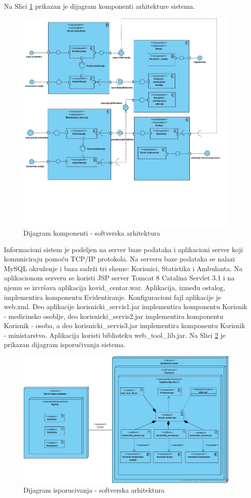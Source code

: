 \documentclass[titlepage]{article}
\begin{document}
Na Slici \ref{slk:komponente} prikazan je dijagram komponenti arhitekture sistema.

\begin{figure}[H]
\centering
\includegraphics[scale=0.65]{Dijagram_komponenti}
\caption{Dijagram komponenti - softverska arhitektura}
\label{slk:komponente}
\end{figure}

Informacioni sistem je podeljen na server baze podataka i aplikacioni server koji komuniciraju pomoću TCP/IP protokola. Na serveru baze podataka se nalazi MySQL okruženje i baza sadrži tri sheme: Korisnici, Statistika i Ambulanta. Na aplikacionom serveru se koristi JSP server Tomcat 8 Catalina Servlet 3.1 i na njemu se izvršava aplikacija kovid\_centar.war. Aplikacija, između ostalog, implementira komponentu Evidentiranje. Konfiguracioni fajl aplikacije je web.xml. Deo aplikacije korisnicki\_servis1.jar implementira komponentu Korisnik - medicinsko osoblje, deo korisnicki\_servis2.jar implementira komponentu Korisnik - osoba, a deo korisnicki\_servis3.jar implementira komponentu Korisnik - ministarstvo. Aplikacija koristi biblioteku web\_tool\_lib.jar. Na Slici \ref{slk:isporucivanje} je prikazan dijagram isporučivanja sistema.

\begin{figure}[H]
\centering
\includegraphics[scale=0.4]{DijagramIsporucivanja}
\caption{Dijagram isporucivanja - softverska arhitektura}
\label{slk:isporucivanje}
\end{figure}
\end{document}
